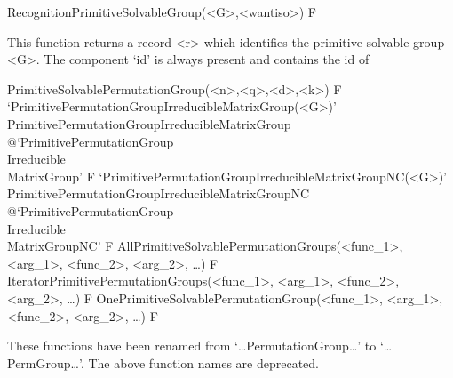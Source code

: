 \>RecognitionPrimitiveSolvableGroup(<G>,<wantiso>) F

This function returns a record <r> which identifies the primitive solvable group <G>.
The component `id' is always present and contains the id of

\>PrimitiveSolvablePermutationGroup(<n>,<q>,<d>,<k>) F
\>`PrimitivePermutationGroupIrreducibleMatrixGroup(<G>)'%
{PrimitivePermutationGroupIrreducibleMatrixGroup}%
@{`PrimitivePermutationGroup\\Irreducible\\MatrixGroup'} F
\>`PrimitivePermutationGroupIrreducibleMatrixGroupNC(<G>)'%
{PrimitivePermutationGroupIrreducibleMatrixGroupNC}%
@{`PrimitivePermutationGroup\\Irreducible\\MatrixGroupNC'} F
\>AllPrimitiveSolvablePermutationGroups(<func_1>, <arg_1>, <func_2>, <arg_2>, \dots) F
\>IteratorPrimitivePermutationGroups(<func_1>, <arg_1>, <func_2>, <arg_2>, \dots) F
\>OnePrimitiveSolvablePermutationGroup(<func_1>, <arg_1>, <func_2>, <arg_2>, \dots) F

These functions have been renamed from `\dots PermutationGroup\dots' to `\dots PermGroup\dots'.
The above function names are deprecated.


